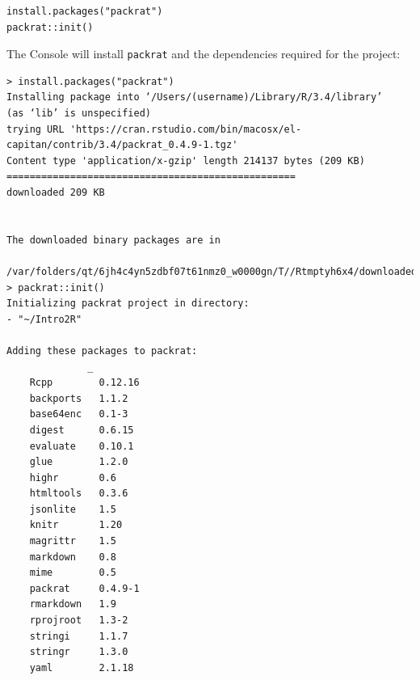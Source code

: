 \documentclass[]{book}
\theoremstyle{definition}
\theoremstyle{definition}
\theoremstyle{definition}
\theoremstyle{remark}
\begin{document}
\begin{verbatim}
install.packages("packrat")
packrat::init()
\end{verbatim}

The Console will install \texttt{packrat} and the dependencies required
for the project:

\begin{verbatim}
> install.packages("packrat")
Installing package into ‘/Users/(username)/Library/R/3.4/library’
(as ‘lib’ is unspecified)
trying URL 'https://cran.rstudio.com/bin/macosx/el-capitan/contrib/3.4/packrat_0.4.9-1.tgz'
Content type 'application/x-gzip' length 214137 bytes (209 KB)
==================================================
downloaded 209 KB


The downloaded binary packages are in
    /var/folders/qt/6jh4c4yn5zdbf07t61nmz0_w0000gn/T//Rtmptyh6x4/downloaded_packages
> packrat::init()
Initializing packrat project in directory:
- "~/Intro2R"

Adding these packages to packrat:
              _        
    Rcpp        0.12.16
    backports   1.1.2  
    base64enc   0.1-3  
    digest      0.6.15 
    evaluate    0.10.1 
    glue        1.2.0  
    highr       0.6    
    htmltools   0.3.6  
    jsonlite    1.5    
    knitr       1.20   
    magrittr    1.5    
    markdown    0.8    
    mime        0.5    
    packrat     0.4.9-1
    rmarkdown   1.9    
    rprojroot   1.3-2  
    stringi     1.1.7  
    stringr     1.3.0  
    yaml        2.1.18 


\end{verbatim}
\end{document}
